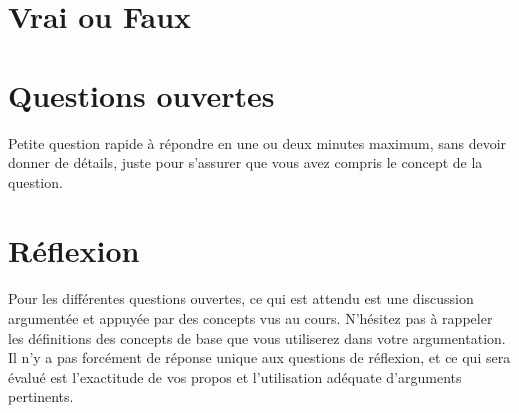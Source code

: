 


\newcommand{\vf}[3]{\textcolor{dkblue}{\textit{#1}}\hspace*{.2cm}#2\vspace*{.2cm}\par\hspace*{.5cm}#3}
\newcommand{\qouv}[2]{\textcolor{dkblue}{\textit{#1}}\vspace*{.2cm}\par\hspace*{.5cm}#2}

\newcommand{\vrai}[0]{\textcolor{dkgreen}{Vrai}}
\newcommand{\faux}[0]{\textcolor{dkred}{Faux}}




\chapter{Vrai ou Faux}
\begin{enumerate}\setlength\itemsep{1em}




\end{enumerate}



\chapter{Questions ouvertes}
Petite question rapide à répondre en une ou deux minutes maximum, sans devoir donner de détails,
juste pour s’assurer que vous avez compris le concept de la question.
\paragraph{}
\begin{enumerate}\setlength\itemsep{1em}



\end{enumerate}


\chapter{Réflexion}
Pour les différentes questions ouvertes, ce qui est attendu est une discussion argumentée et appuyée
par des concepts vus au cours. N’hésitez pas à rappeler les définitions des concepts de base que vous
utiliserez dans votre argumentation. Il n’y a pas forcément de réponse unique aux questions de réflexion,
et ce qui sera évalué est l’exactitude de vos propos et l’utilisation adéquate d’arguments pertinents.
